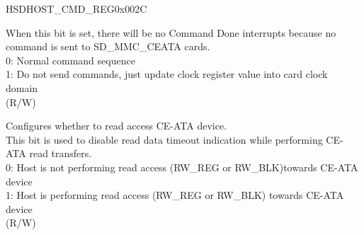 \begin{register}{H}{SDHOST\_CMD\_REG}{0x002C}
\begin{regdesc}
\begin{reglist}
When this bit is set, there will be no Command Done interrupts because no command is sent to SD\_MMC\_CEATA cards. \\
0: Normal command sequence\\
1: Do not send commands, just update clock register value into card clock domain\\(R/W)
\label{fielddesc:SDHOSTREADCEATADEVICE}\item [SDHOST\_READ\_CEATA\_DEVICE] Configures whether to read access CE-ATA device.\\
This bit is used to disable read data timeout indication while performing CE-ATA read transfers. \\
0: Host is not performing read access (RW\_REG or RW\_BLK)towards CE-ATA device\\
1: Host is performing read access (RW\_REG or RW\_BLK) towards CE-ATA device\\
(R/W)
\item [Continued on the next page...]
\end{reglist}\end{regdesc}
\end{register}

